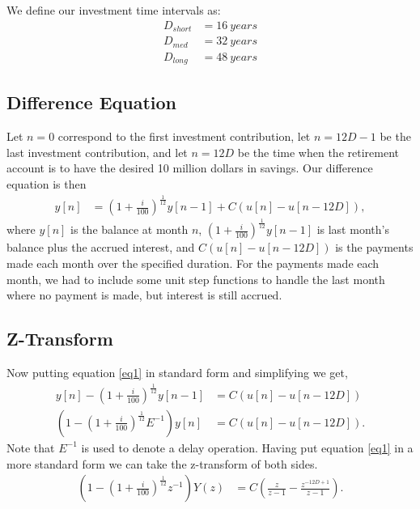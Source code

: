 \documentclass[letterpaper]{article}
\begin{document}
We define our investment time intervals as:
\begin{align*}
	D_{short} &= \SI{16}{years}  \\
	D_{med}   &= \SI{32}{years}  \\
	D_{long}  &= \SI{48}{years}
\end{align*}

\pagebreak
\subsection{Difference Equation}
Let $n=0$ correspond to the first investment contribution, let $n = 12D -1$ be the last investment contribution, and let $n = 12D$ be the time when the retirement account is to have the desired 10 million dollars in savings. Our difference equation is then
\begin{align}
	y[n] &= \left(1 + \frac{i}{100} \right)^{\frac{1}{12}} y[n-1] + C (u[n] - u[n-12D]), \label{eq1}
\end{align}
where $y[n]$ is the balance at month $n$, $\left(1 + \frac{i}{100} \right)^{\frac{1}{12}} y[n-1]$ is last month's balance plus the accrued interest, and $C(u[n] - u[n-12D])$ is the payments made each month over the specified duration. For the payments made each month, we had to include some unit step functions to handle the last month where no payment is made, but interest is still accrued.

\subsection{Z-Transform}

Now putting equation \ref{eq1} in standard form and simplifying we get,
\begin{align}
	y[n] - \left(1 + \frac{i}{100} \right)^{\frac{1}{12}} y[n-1] &= C (u[n] - u[n-12D]) \\
	\left(1 - \left(1 + \frac{i}{100} \right)^{\frac{1}{12}}E^{-1}\right)y[n] &= C (u[n] - u[n-12D]). \label{eq2}
\end{align}
Note that $E^{-1}$ is used to denote a delay operation. Having put equation \ref{eq1} in a more standard form we can take the z-transform of both sides.
\begin{align}
	\left(1 - \left(1 + \frac{i}{100} \right)^{\frac{1}{12}}z^{-1}\right)Y(z) &= C \left(\frac{z}{z-1} - \frac{z^{-12D+1}}{z-1} \right).
\end{align}
\end{document}

